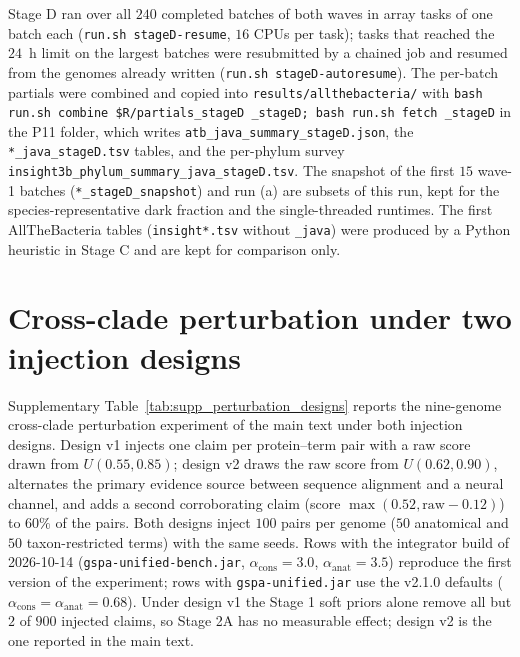 \documentclass[10pt]{article}
\begin{document}
Stage D ran over all $240$ completed batches of both waves in array tasks of one batch each (\texttt{run.sh stageD-resume}, $16$ CPUs per task); tasks that reached the $24$~h limit on the largest batches were resubmitted by a chained job and resumed from the genomes already written (\texttt{run.sh stageD-autoresume}). The per-batch partials were combined and copied into \texttt{results/allthebacteria/} with \texttt{bash run.sh combine \$R/partials\_stageD \_stageD; bash run.sh fetch \_stageD} in the P11 folder, which writes \texttt{atb\_java\_summary\_stageD.json}, the \texttt{*\_java\_stageD.tsv} tables, and the per-phylum survey \texttt{insight3b\_phylum\_summary\_java\_stageD.tsv}. The snapshot of the first $15$ wave-1 batches (\texttt{*\_stageD\_snapshot}) and run (a) are subsets of this run, kept for the species-representative dark fraction and the single-threaded runtimes. The first AllTheBacteria tables (\texttt{insight*.tsv} without \texttt{\_java}) were produced by a Python heuristic in Stage C and are kept for comparison only.





\section{Cross-clade perturbation under two injection designs}
\label{sec:supp_perturbation_designs}

Supplementary Table~\ref{tab:supp_perturbation_designs} reports the nine-genome cross-clade perturbation experiment of the main text under both injection designs. Design v1 injects one claim per protein--term pair with a raw score drawn from $U(0.55, 0.85)$; design v2 draws the raw score from $U(0.62, 0.90)$, alternates the primary evidence source between sequence alignment and a neural channel, and adds a second corroborating claim (score $\max(0.52, \text{raw} - 0.12)$) to $60\%$ of the pairs. Both designs inject $100$ pairs per genome ($50$ anatomical and $50$ taxon-restricted terms) with the same seeds. Rows with the integrator build of 2026-10-14 (\texttt{gspa-unified-bench.jar}, $\alpha_{\text{cons}} = 3.0$, $\alpha_{\text{anat}} = 3.5$) reproduce the first version of the experiment; rows with \texttt{gspa-unified.jar} use the v2.1.0 defaults ($\alpha_{\text{cons}} = \alpha_{\text{anat}} = 0.68$). Under design v1 the Stage 1 soft priors alone remove all but $2$ of $900$ injected claims, so Stage 2A has no measurable effect; design v2 is the one reported in the main text.
\end{document}
